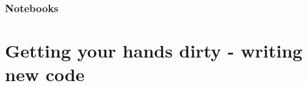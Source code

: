 \documentclass[10pt,modern]{scrartcl}
\numberwithin{exerciseitem}{exercise} %
\begin{document}


\section*{Notebooks}

%



%



%


%



\newpage

\part{Getting your hands dirty - writing new code}
\end{document}
